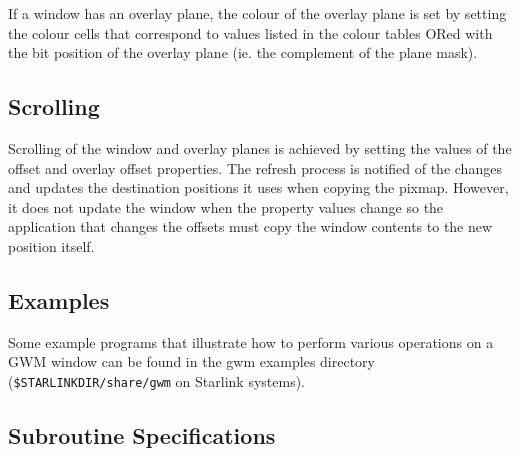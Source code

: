 \documentclass[twoside,11pt]{article}
\renewcommand{\_}{\texttt{\symbol{95}}}
\begin{document}
If a window has an overlay plane, the colour of the overlay plane is set
by setting the colour cells that correspond to values listed in the
colour tables ORed with the bit position of the overlay plane (ie. the
complement of the plane mask).

\subsection{Scrolling}
Scrolling of the window and overlay planes is achieved by setting the
values of the offset and overlay offset properties. The refresh process
is notified of the changes and updates the destination positions it uses
when copying the pixmap. However, it does not update the window when the
property values change so the application that changes the offsets must
copy the window contents to the new position itself.

\subsection{Examples}

Some example programs that illustrate how to perform various operations on a
GWM window can be found in the gwm examples directory 
({\tt \$STARLINK\_DIR/share/gwm}
on Starlink systems).

\newpage
\subsection{Subroutine Specifications}
\end{document}
